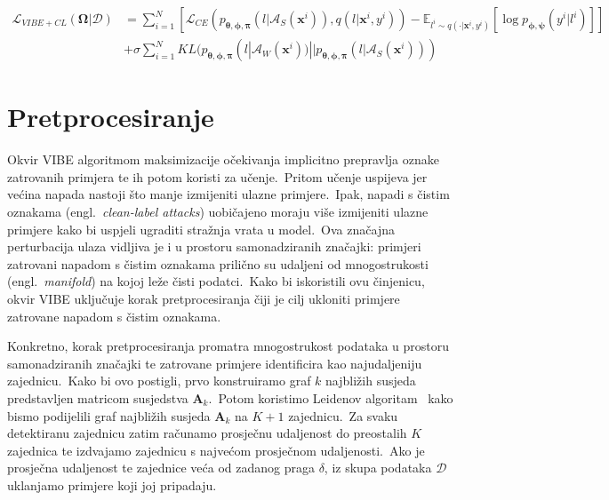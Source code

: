 \documentclass[diplomskirad]{fer}
\begin{document}
\begin{equation}
  \begin{aligned}
    \mathcal{L}_{VIBE + CL}(\bm{\Omega} | \mathcal{D}) &= \sum_{i=1}^{N} \left[ \mathcal{L}_{CE} (p_{\bm{\theta}, \bm{\phi}, \bm{\pi}}(l | \mathcal{A}_{S}(\bm{x}^i)), q(l | \bm{x}^i, y^i)) - \mathbb{E}_{l^i \sim q(\cdot | \bm{x}^i, y^i)} \left[ \log p_{\bm{\phi}, \bm{\psi}}(y^i | l^i) \right] \right] \\
                                                       &+ \sigma \sum_{i=1}^{N} KL(p_{\bm{\theta}, \bm{\phi}, \bm{\pi}}(l | \mathcal{A}_{W}(\bm{x}^i)) || p_{\bm{\theta}, \bm{\phi}, \bm{\pi}}(l | \mathcal{A}_{S}(\bm{x}^i)))
  \end{aligned}
  \label{eq:vibe_with_con_loss}
\end{equation}

\section{Pretprocesiranje}
\label{sek:pretproc}

Okvir VIBE algoritmom maksimizacije očekivanja implicitno prepravlja oznake zatrovanih primjera te ih potom koristi za učenje.\ 
Pritom učenje uspijeva jer većina napada nastoji što manje izmijeniti ulazne primjere.\ 
Ipak, napadi s čistim oznakama (engl.\ \textit{clean-label attacks}) uobičajeno moraju više izmijeniti ulazne primjere kako bi uspjeli ugraditi stražnja vrata u model.\ 
Ova značajna perturbacija ulaza vidljiva je i u prostoru samonadziranih značajki: primjeri zatrovani napadom s čistim oznakama prilično su udaljeni od mnogostrukosti (engl.\ \textit{manifold}) na kojoj leže čisti podatci.\ 
Kako bi iskoristili ovu činjenicu, okvir VIBE uključuje korak pretprocesiranja čiji je cilj ukloniti primjere zatrovane napadom s čistim oznakama.\ 

Konkretno, korak pretprocesiranja promatra mnogostrukost podataka u prostoru samonadziranih značajki te zatrovane primjere identificira kao najudaljeniju zajednicu.\ 
Kako bi ovo postigli, prvo konstruiramo graf $k$ najbližih susjeda predstavljen matricom susjedstva $\bm{A}_k$.\ 
Potom koristimo Leidenov algoritam~\cite{traag2019louvain} kako bismo podijelili graf najbližih susjeda $\bm{A}_k$ na $K + 1$ zajednicu.\ 
Za svaku detektiranu zajednicu zatim računamo prosječnu udaljenost do preostalih $K$ zajednica te izdvajamo zajednicu s najvećom prosječnom udaljenosti.\ 
Ako je prosječna udaljenost te zajednice veća od zadanog praga $\delta$, iz skupa podataka $\mathcal{D}$ uklanjamo primjere koji joj pripadaju.\ 
\end{document}
